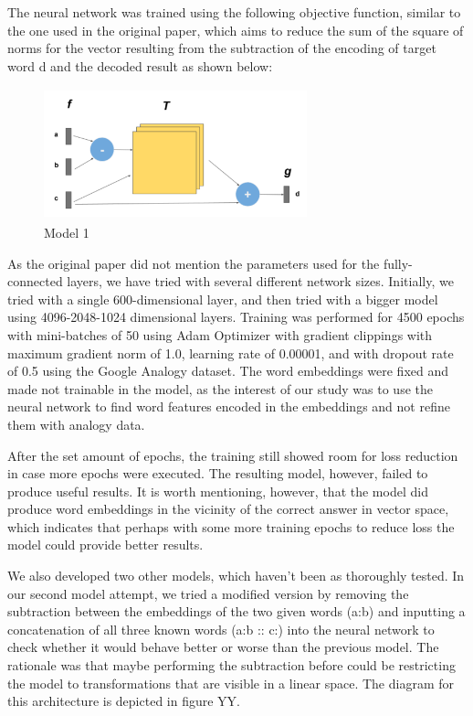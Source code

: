 \documentclass[11pt]{article}
\begin{document}
The neural network was trained using the following objective function,
similar to the one used in the original paper, which aims to reduce the
sum of the square of norms for the vector resulting from the subtraction
of the encoding of target word d and the decoded result as shown below:

\begin{figure}
  \centering
\includegraphics[width=3.0in,height=1.5in]{./model_1.png}
  \caption{Model 1}
\end{figure}

As the original paper did not mention the parameters used for the
fully-connected layers, we have tried with several different network
sizes. Initially, we tried with a single 600-dimensional layer, and then
tried with a bigger model using 4096-2048-1024 dimensional layers.
Training was performed for 4500 epochs with mini-batches of 50 using
Adam Optimizer with gradient clippings with maximum gradient norm of
1.0, learning rate of 0.00001, and with dropout rate of 0.5 using the
Google Analogy dataset. The word embeddings were fixed and made not
trainable in the model, as the interest of our study was to use the
neural network to find word features encoded in the embeddings and not
refine them with analogy data.

After the set amount of epochs, the training still showed room for loss
reduction in case more epochs were executed. The resulting model,
however, failed to produce useful results. It is worth mentioning,
however, that the model did produce word embeddings in the vicinity of
the correct answer in vector space, which indicates that perhaps with some more training epochs to
reduce loss the model could provide better results.

We also developed two other models, which haven't been as thoroughly
tested. In our second model attempt, we tried a modified version by
removing the subtraction between the embeddings of the two given words
(a:b) and inputting a concatenation of all three known words (a:b :: c:)
into the neural network to check whether it would behave better or worse
than the previous model. The rationale was that maybe performing the
subtraction before could be restricting the model to transformations
that are visible in a linear space. The diagram for this architecture is
depicted in figure YY.
\end{document}
